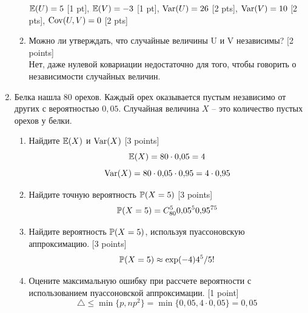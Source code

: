 \documentclass[12pt, a4paper]{article}\usepackage[]{graphicx}\usepackage[]{color}
\begin{document}
\begin{enumerate}
\begin{enumerate}
$\E(U)=5$ [1 pt], $\E(V)=-3$ [1 pt], $\Var(U)=26$ [2 pts], $\Var(V)=10$ [2 pts], $\Cov(U,V)=0$ [2 pts]
\item Можно ли утверждать, что случайные величины U и V независимы? [2 points]\\
Нет, даже нулевой ковариации недостаточно для того, чтобы говорить о независимости случайных величин.
\end{enumerate}



\item Белка нашла 80 орехов. Каждый орех оказывается пустым независимо от других с вероятностью $0{,}05$. Случайная величина $X$ -- это количество пустых орехов у белки.
\begin{enumerate}
\item Найдите $\E(X)$ и $\Var(X)$ [3 points]
\begin{equation}
\E(X)=80\cdot 0{,}05=4
\end{equation}
\begin{equation}
\Var(X)=80\cdot 0{,}05\cdot 0{,}95=4\cdot 0{,}95
\end{equation}
\item Найдите точную вероятность $\P(X=5)$ [3 points]
\begin{equation}
\P(X=5)=C_{80}^{5}0{,}05^{5}0{,}95^{75}
\end{equation}
\item Найдите вероятность $\P(X=5)$, используя пуассоновскую аппроксимацию. [3 points]
\begin{equation}
\P(X=5)\approx \exp(-4)4^5/5!
\end{equation}
\item Оцените максимальную ошибку при рассчете вероятности с использованием пуассоновской аппроксимации. [1 point]
\begin{equation}
\triangle\leq \min\{p,np^2\}=\min\{0{,}05,4\cdot 0{,}05\}=0{,}05
\end{equation}
\end{enumerate}





\end{enumerate}
\end{document}
